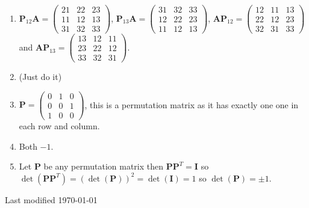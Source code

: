 \documentclass[11pt,a4paper]{article}
\def\bA{\mathbf{A}}
\def\bI{\mathbf{I}}
\def\bP{\mathbf{P}}
\begin{document}
\begin{enumerate}
{\noindent\hrulefill
\begin{enumerate}
\item
$\bP_{12} \bA= \left(
\begin{array}{ccc}
 21 & 22 & 23 \\
 11 & 12 & 13 \\
 31 & 32 & 33
\end{array}
\right)$,  $\bP_{13} \bA=\left(
\begin{array}{ccc}
 31 & 32 & 33 \\
 12 & 22 & 23 \\
 11 & 12 & 13
\end{array}
\right)$,   $\bA\bP_{12}=\left(
\begin{array}{ccc}
 12 & 11 & 13 \\
 22 & 12 & 23 \\
 32 & 31 & 33
\end{array}
\right)$ and  $\bA\bP_{13}=\left(
\begin{array}{ccc}
 13 & 12 & 11 \\
 23 & 22 & 12 \\
 33 & 32 & 31
\end{array}
\right)$.
\item (Just do it)
\item $\bP=\left(
\begin{array}{ccc}
 0 & 1 & 0 \\
 0 & 0 & 1 \\
 1 & 0 & 0
\end{array}
\right)$, this is a permutation matrix as it has exactly one one in each row and column.
\item Both $-1$.
\item Let $\bP$ be any permutation matrix then $\bP \bP^T=\bI$ so $\det(\bP \bP^T)=\left( \det(\bP)\right)^2= \det(\bI) =1$ so $\det(\bP)=\pm 1$.

\end{enumerate}

\noindent\hrulefill

}{}%


\end{enumerate}
\hfill {\tiny Last modified  \today}
\vfill\eject
\end{document}
